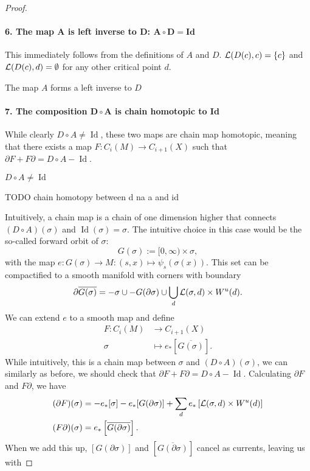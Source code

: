 \begin{proof}
\paragraph{6. The map $\bm{A}$ is left inverse to $\bm{D}$: $\bm{A  \circ D = \text{Id}}$}
    This immediately follows from the definitions of $A$ and $D$.
    $\mathcal L(D(c), c) = \{c\}$ and $\mathcal L(D(c), d) = \emptyset$ for any other critical point $d$.
\begin{marginfigure}
    \centering
    \caption{The map $A$ forms a left inverse to $D$}
    \label{fig:a-is-left-inverse-to-d}
\end{marginfigure}


\paragraph{7. The composition $\bm{D  \circ A}$ is chain homotopic to Id}
While clearly $D  \circ  A \neq \operatorname{Id}$, these two maps are chain map homotopic, meaning that there exists a map $F: C_i(M) \to  C_{i+1}(X)$ such that $\partial F + F \partial = D  \circ  A - \operatorname{Id}$.
\begin{marginfigure}
    \centering
    \caption{$D  \circ  A \neq  \operatorname{Id}$}
    \label{fig:d-na-a-is-not-identity}
\end{marginfigure}
\begin{marginfigure}
    \centering
    \caption{TODO chain homotopy between d na a and id}
    \label{fig:chain-homotopy-between-d-na-a-and-id}
\end{marginfigure}
Intuitively, a chain map is a chain of one dimension higher that connects $(D  \circ  A)(\sigma)$ and $\operatorname{Id} (\sigma) = \sigma$.
The intuitive choice in this case would be the so-called forward orbit of $\sigma$:
\[
    G(\sigma) := [0, \infty) \times \sigma
,\] with the map $e: G(\sigma) \to  M: (s, x) \mapsto \psi_s (\sigma(x))$.
This set can be compactified to a smooth manifold with corners with boundary
\[
    \partial \overline{G(\sigma)} = - \sigma \cup - G(\partial \sigma) \cup \bigcup_{d}  \mathcal L(\sigma, d) \times W^u(d)
.\] 
We can extend $e$ to a smooth map and define 
\begin{align*}
    F: C_i(M) &\longrightarrow C_{i+1}(X) \\
    \sigma &\longmapsto e_* \left[ \overline{G(\sigma)} \right] 
.\end{align*}
While intuitively, this is a chain map between $\sigma$ and  $(D  \circ A)(\sigma)$, we can similarly as before, we should check that $\partial F + F \partial = D  \circ  A - \operatorname{Id}$.
Calculating $\partial F$ and  $F \partial$, we have
\begin{align*}
    (\partial F)(\sigma) &= -e_*[\sigma] - e_*[G(\partial \sigma)] + \sum_{d} e_*\left[\mathcal L(\sigma, d) \times W^u(d)\right]\\
    (F \partial)(\sigma) &= e_*\left[\overline{G(\partial \sigma)}\right]
    .\end{align*}
    When we add this up, $[G (\partial \sigma)]$ and $\left[ \overline{G(\partial \sigma)} \right]$ cancel as currents, leaving us with


\end{proof}
